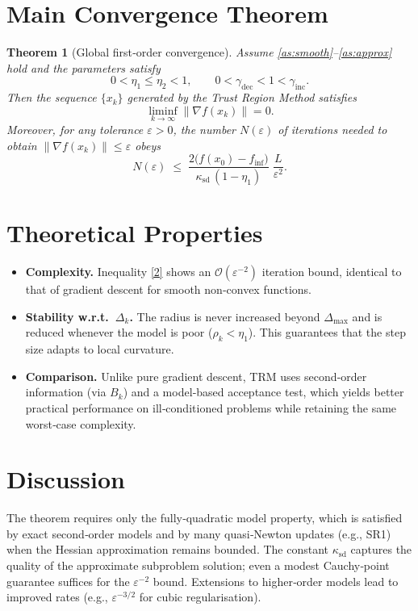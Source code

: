 \documentclass{article}
\newtheorem{theorem}{Theorem}
\newcommand{\norm}[1]{\left\lVert #1\right\rVert}
\begin{document}
\section*{Main Convergence Theorem}
\begin{theorem}[Global first‑order convergence]\label{thm:global}
Assume \ref{as:smooth}–\ref{as:approx} hold and the parameters satisfy
\[
0<\eta_1\le\eta_2<1,\qquad
0<\gamma_{\text{dec}}<1<\gamma_{\text{inc}}.
\]
Then the sequence $\{x_k\}$ generated by the Trust Region Method satisfies
\[
\liminf_{k\to\infty}\norm{\nabla f(x_k)} = 0.
\]
Moreover, for any tolerance $\varepsilon>0$, the number $N(\varepsilon)$ of iterations needed to obtain
$\norm{\nabla f(x_k)}\le\varepsilon$ obeys
\[
N(\varepsilon)\;\le\;
\frac{2\big(f(x_0)-f_{\inf}\big)}{\kappa_{\text{sd}}\,(1-\eta_1)}\;
\frac{L}{\varepsilon^{2}} .
\tag{2}
\]
\end{theorem}

\section*{Theoretical Properties}
\begin{itemize}
\item \textbf{Complexity.} Inequality \eqref{2} shows an $\mathcal O(\varepsilon^{-2})$ iteration bound, identical to that of gradient descent for smooth non‑convex functions.
\item \textbf{Stability w.r.t.\ $\Delta_k$.} The radius is never increased beyond $\Delta_{\max}$ and is reduced whenever the model is poor ($\rho_k<\eta_1$). This guarantees that the step size adapts to local curvature.
\item \textbf{Comparison.} Unlike pure gradient descent, TRM uses second‑order information (via $B_k$) and a model‑based acceptance test, which yields better practical performance on ill‑conditioned problems while retaining the same worst‑case complexity.
\end{itemize}

\section*{Discussion}
The theorem requires only the fully‑quadratic model property, which is satisfied by exact second‑order models and by many quasi‑Newton updates (e.g., SR1) when the Hessian approximation remains bounded.  The constant $\kappa_{\text{sd}}$ captures the quality of the approximate subproblem solution; even a modest Cauchy‑point guarantee suffices for the $\varepsilon^{-2}$ bound.  Extensions to higher‑order models lead to improved rates (e.g., $\varepsilon^{-3/2}$ for cubic regularisation).
\end{document}
